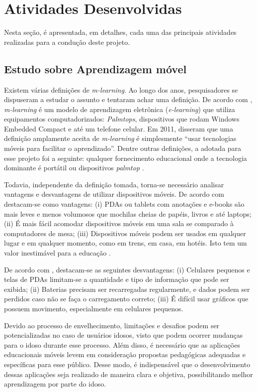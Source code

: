 \chapter{Atividades Desenvolvidas}\label{sec:ativ_desenvolvidas}
Nesta seção, é apresentada, em detalhes, cada uma das principais atividades realizadas para a condução deste projeto.

\section{Estudo sobre Aprendizagem móvel}\label{sec:estudos_ap_movel} 
Existem várias definições de \textit{m-learning}. Ao longo dos anos, pesquisadores se dispuseram a estudar o assunto e tentaram achar uma definição. De acordo com \cite{Quinn2000}, \textit{m-learning} é um modelo de aprendizagem eletrônica (\textit{e-learning}) que utiliza equipamentos computadorizados: \textit{Palmtops}, dispositivos que rodam Windows Embedded Compact e até um telefone celular.
Em 2011, \cite{hwang2011research} disseram que uma definição amplamente aceita de \textit{m-learning} é simplesmente ``usar tecnologias móveis para facilitar o aprendizado''. Dentre outras definições, a adotada para esse projeto foi a seguinte: qualquer fornecimento educacional onde a tecnologia dominante é portátil ou dispositivos \textit{palmtop} \citep{traxler2005defining}.

Todavia, independente da definição tomada, torna-se necessário analisar vantagens e desvantagens de utilizar dispositivos móveis. De acordo com \cite{RICHAMEHTA2016} destacam-se como vantagens: (i) PDAs ou tablets com anotações e e-books são mais leves e menos volumosos que mochilas cheias de papéis, livros e até laptops; (ii) É mais fácil acomodar dispositivos móveis em uma sala se comparado à computadores de mesa; (iii) Dispositivos móveis podem ser usados em qualquer lugar e em qualquer momento, como em trens, em casa, em hotéis. Isto tem um valor inestimável para a educação \citep{CarmaMaia2008}.

De acordo com \cite{RICHAMEHTA2016}, destacam-se as seguintes desvantagens: (i) Celulares pequenos e telas de PDAs limitam-se a quantidade e tipo de informação que pode ser exibida; (ii) Baterias precisam ser recarregadas regularmente, e dados podem ser perdidos caso não se faça o carregamento correto; (iii) É difícil usar gráficos que possuem movimento, especialmente em celulares pequenos.

Devido ao processo de envelhecimento, limitações e desafios podem ser potencializadas no caso de usuários idosos, visto que podem ocorrer mudanças para o idoso durante esse processo. Além disso, é necessário que as aplicações educacionais móveis levem em consideração propostas pedagógicas adequadas e específicas para esse público. Desse modo, é indispensável que o desenvolvimento dessas aplicações seja realizado de maneira clara e objetiva, possibilitando melhor aprendizagem por parte do idoso.

